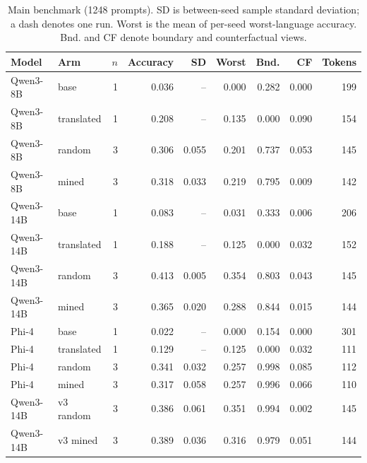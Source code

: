 \begin{table}[t]
\caption{Main benchmark (1248 prompts). SD is between-seed sample standard deviation; a dash denotes one run. Worst is the mean of per-seed worst-language accuracy. Bnd. and CF denote boundary and counterfactual views.}\label{t:main}
\centering\small
\setlength{\tabcolsep}{4pt}
\begin{tabular}{llrrrrrrr}
\toprule
Model & Arm & $n$ & Accuracy & SD & Worst & Bnd. & CF & Tokens\\\midrule
Qwen3-8B & base & 1 & 0.036 & -- & 0.000 & 0.282 & 0.000 & 199\\
Qwen3-8B & translated & 1 & 0.208 & -- & 0.135 & 0.000 & 0.090 & 154\\
Qwen3-8B & random & 3 & 0.306 & 0.055 & 0.201 & 0.737 & 0.053 & 145\\
Qwen3-8B & mined & 3 & 0.318 & 0.033 & 0.219 & 0.795 & 0.009 & 142\\
Qwen3-14B & base & 1 & 0.083 & -- & 0.031 & 0.333 & 0.006 & 206\\
Qwen3-14B & translated & 1 & 0.188 & -- & 0.125 & 0.000 & 0.032 & 152\\
Qwen3-14B & random & 3 & 0.413 & 0.005 & 0.354 & 0.803 & 0.043 & 145\\
Qwen3-14B & mined & 3 & 0.365 & 0.020 & 0.288 & 0.844 & 0.015 & 144\\
Phi-4 & base & 1 & 0.022 & -- & 0.000 & 0.154 & 0.000 & 301\\
Phi-4 & translated & 1 & 0.129 & -- & 0.125 & 0.000 & 0.032 & 111\\
Phi-4 & random & 3 & 0.341 & 0.032 & 0.257 & 0.998 & 0.085 & 112\\
Phi-4 & mined & 3 & 0.317 & 0.058 & 0.257 & 0.996 & 0.066 & 110\\
Qwen3-14B & v3 random & 3 & 0.386 & 0.061 & 0.351 & 0.994 & 0.002 & 145\\
Qwen3-14B & v3 mined & 3 & 0.389 & 0.036 & 0.316 & 0.979 & 0.051 & 144\\
\bottomrule
\end{tabular}
\end{table}

